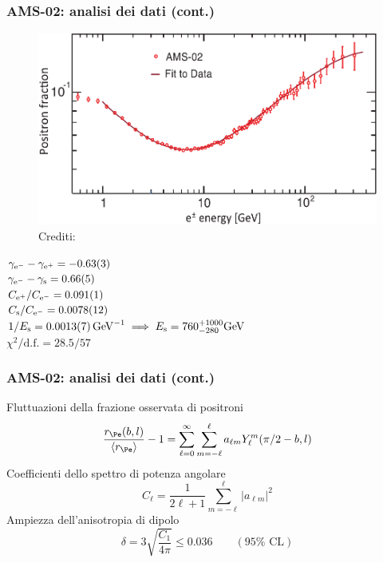 \documentclass[10pt]{beamer}
\begin{document}
\begin{frame}
  \frametitle{AMS-02: analisi dei dati (cont.)}
  \begin{figure}
    \centering
    \includegraphics[width=.6\columnwidth]{ams2}
    \caption{Crediti: \textcite{2013PhRvL.110n1102A}}
  \end{figure}
  $\gamma_{\textup{e}^{-}} - \gamma_{\textup{e}^{+}} = \num{-0.63(3)}$ \\
  $\gamma_{\textup{e}^{-}} - \gamma_{\textup{s}} = \num{0.66(5)}$ \\
  $C_{\textup{e}^{+}}/C_{\textup{e}^{-}} = \num{0.091(1)}$ \\
  $C_{\textup{s}}/C_{\textup{e}^{-}} = \num{0.0078(12)}$ \\
  $1/E_{\textup{s}} =
  \SI[per-mode=reciprocal]{0.0013(7)}{\per\giga\electronvolt} \implies
  E_{\textup{s}} = 760^{+1000}_{-280} \si{\giga \electronvolt}$ \\
  $\chi^{2}/\text{d.f.} = 28.5/57$
\end{frame}

\begin{frame}
  \frametitle{AMS-02: analisi dei dati (cont.)}
  Fluttuazioni della frazione osservata di positroni
  \begin{equation*}
    \frac{r_{\Pe}(b,l)}{\langle r_{\Pe}\rangle} - 1 = \sum_{\ell=0}^{\infty}
    \sum_{m=-\ell}^{\ell} a_{\ell m}Y_{\ell}^{m}(\pi/2 - b,l)
  \end{equation*}
  Coefficienti dello spettro di potenza angolare
  \begin{equation*}
    C_{\ell} = \frac{1}{2\ell + 1} \sum_{m=-\ell}^{\ell} \lvert a_{\ell m}
    \rvert^{2}
  \end{equation*}
  Ampiezza dell'anisotropia di dipolo
  \begin{equation*}
    \delta = 3 \sqrt{\frac{C_{1}}{4\pi}} \leq 0.036 \qquad (95\% \text{ CL})
  \end{equation*}
\end{frame}
\end{document}
